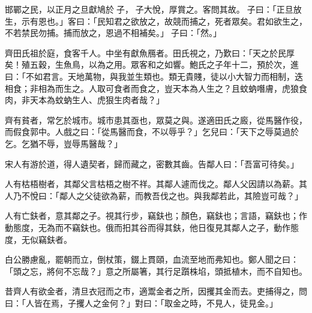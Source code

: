 \begin{pinyinscope}
邯鄲之民，以正月之旦獻鳩於𥳑子，𥳑子大悅，厚賞之。客問其故。𥳑子曰：「正旦放生，示有恩也。」客曰：「民知君之欲放之，故競而捕之，死者眾矣。君如欲生之，不若禁民勿捕。捕而放之，恩過不相補矣。」𥳑子曰：「然。」

齊田氏祖於庭，食客千人。中坐有獻魚鴈者。田氏視之，乃歎曰：「天之於民厚矣！殖五穀，生魚鳥，以為之用。眾客和之如響。鮑氏之子年十二，預於次，進曰：「不如君言。天地萬物，與我並生類也。類无貴賤，徒以小大智力而相制，迭相食；非相為而生之。人取可食者而食之，豈天本為人生之？且蚊蚋噆膚，虎狼食肉，非天本為蚊蚋生人、虎狠生肉者哉？」

齊有貧者，常乞於城市。城市患其亟也，眾莫之與。遂適田氏之廄，從馬醫作役，而假食郭中。人戲之曰：「從馬醫而食，不以辱乎？」乞兒曰：「天下之辱莫過於乞。乞猶不辱，豈辱馬醫哉？」

宋人有游於道，得人遺契者，歸而藏之，密數其齒。告鄰人曰：「吾富可待矣。」

人有枯梧樹者，其鄰父言枯梧之樹不祥。其鄰人遽而伐之。鄰人父因請以為薪。其人乃不悅曰：「鄰人之父徒欲為薪，而教吾伐之也。與我鄰若此，其險豈可哉？」

人有亡鈇者，意其鄰之子。視其行步，竊鈇也；顏色，竊鈇也；言語，竊鈇也；作動態度，无為而不竊鈇也。俄而抇其谷而得其鈇，他日復見其鄰人之子，動作態度，无似竊鈇者。

白公勝慮亂，罷朝而立，倒杖策，錣上貫頤，血流至地而弗知也。鄭人聞之曰：「頭之忘，將何不忘哉？」意之所屬箸，其行足躓株埳，頭抵植木，而不自知也。

昔齊人有欲金者，清旦衣冠而之市，適鬻金者之所，因攫其金而去。吏捕得之，問曰：「人皆在焉，子攫人之金何？」對曰：「取金之時，不見人，徒見金。」


\end{pinyinscope}